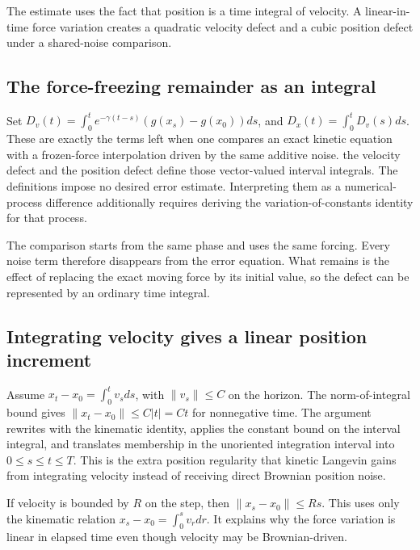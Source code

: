 \documentclass[11pt,a4paper]{report}
\begin{document}
The estimate uses the fact that position is a time integral of velocity. A linear-in-time force variation creates a quadratic velocity defect and a cubic position defect under a shared-noise comparison.

\subsection{\texorpdfstring{The force-freezing remainder as an integral}{The force-freezing remainder as an integral}}
\label{report-step-KineticLangevin-LocalError-lean-1}


Set \(D_v(t)=\int_0^te^{-\gamma(t-s)}(g(x_s)-g(x_0))ds\), and \(D_x(t)=\int_0^tD_v(s)ds\). These are exactly the terms left when one compares an exact kinetic equation with a frozen-force interpolation driven by the same additive noise. the velocity defect and the position defect define those vector-valued interval integrals. The definitions impose no desired error estimate. Interpreting them as a numerical-process difference additionally requires deriving the variation-of-constants identity for that process.



The comparison starts from the same phase and uses the same forcing. Every noise term therefore disappears from the error equation. What remains is the effect of replacing the exact moving force by its initial value, so the defect can be represented by an ordinary time integral.

\subsection{\texorpdfstring{Integrating velocity gives a linear position increment}{Integrating velocity gives a linear position increment}}
\label{report-step-KineticLangevin-LocalError-lean-2}


Assume \(x_t-x_0=\int_0^tv_sds\), with \(\|v_s\|\le C\) on the horizon. The norm-of-integral bound gives \(\|x_t-x_0\|\le C|t|=Ct\) for nonnegative time. The argument rewrites with the kinematic identity, applies the constant bound on the interval integral, and translates membership in the unoriented integration interval into \(0\le s\le t\le T\). This is the extra position regularity that kinetic Langevin gains from integrating velocity instead of receiving direct Brownian position noise.



If velocity is bounded by \(R\) on the step, then \(\|x_s-x_0\|\le Rs\). This uses only the kinematic relation \(x_s-x_0=\int_0^sv_rdr\). It explains why the force variation is linear in elapsed time even though velocity may be Brownian-driven.
\end{document}
